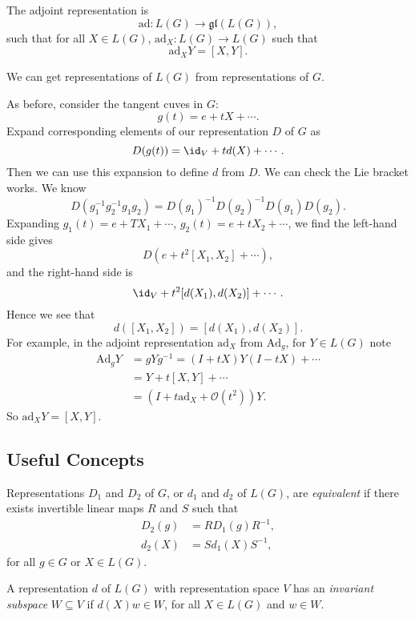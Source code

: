 \documentclass[12pt]{article}
\begin{document}
\begin{definition}
The adjoint representation is
\[
\mathrm{ad} : L(G) \to \mathfrak{gl}(L(G)),
\]
such that for all $X \in L(G)$, $\mathrm{ad}_X : L(G) \to L(G)$ such that
\[
	\mathrm{ad}_X Y = [X, Y].
\]
\end{definition}

We can get representations of $L(G)$ from representations of $G$.

As before, consider the tangent cuves in $G$:
\[
g(t) = e + t X + \cdots.
\]
Expand corresponding elements of our representation $D$ of $G$ as
\[
D(g(t)) = \id_V + t d (X) + \cdots.
\]
Then we can use this expansion to define $d$ from $D$. We can check the Lie bracket works. We know
\[
D(g_1^{-1} g_2^{-1} g_1 g_2) = D(g_1)^{-1} D(g_2)^{-1} D(g_1) D(g_2).
\]
Expanding $g_1(t) = e + T X_1 + \cdots$, $g_2(t) = e + t X_2 + \cdots$, we find the left-hand side gives
\[
	D(e + t^2[X_1, X_2] + \cdots),
\]
and the right-hand side is
\[
	\id_V + t^2[d(X_1), d(X_2)] + \cdots.
\]
Hence we see that
\[
	d([X_1, X_2]) = [d(X_1), d(X_2)].
\]
For example, in the adjoint representation $\mathrm{ad}_X$ from $\mathrm{Ad}_g$, for $Y \in L(G)$ note
\begin{align*}
	\mathrm{Ad}_g Y &= g Y g^{-1} = (I + tX) Y(I - tX) + \cdots \\
			&= Y + t[X, Y] + \cdots \\
			&= (I + t \mathrm{ad}_X + \mathcal{O}(t^2)) Y.
\end{align*}
So $\mathrm{ad}_X Y = [X, Y]$.

\subsection{Useful Concepts}%
\label{sub:use}

\begin{definition}
	Representations $D_1$ and $D_2$ of $G$, or $d_1$ and $d_2$ of $L(G)$, are \emph{equivalent} if there exists invertible linear maps $R$ and $S$ such that
	\begin{align*}
		D_2(g) &= R D_1(g) R^{-1}, \\
		d_2(X) &= S d_1(X) S^{-1},
	\end{align*}
	for all $g \in G$ or $X \in L(G)$.
\end{definition}

\begin{definition}
	A representation $d$ of $L(G)$ with representation space $V$ has an \emph{invariant subspace} $W \subseteq V$ if $d(X) w \in W$, for all $X \in L(G)$ and $w \in W$.
\end{definition}
\end{document}
